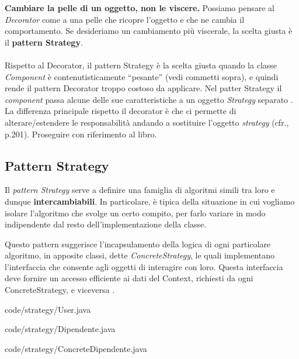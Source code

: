 \documentclass[12pt]{article}
\begin{document}
\textbf{Cambiare la pelle di un oggetto, non le viscere.} Possiamo pensare al {\em Decorator} come a una pelle che ricopre l'oggetto e che ne cambia il comportamento. Se desideriamo un cambiamento più viscerale, la scelta giusta è il \textbf{pattern Strategy}.
\\
\\
Rispetto al Decorator, il pattern Strategy è la scelta giusta quando la classe {\em Component} è contenutisticamente ``pesante'' (vedi commetti sopra), e quindi rende il pattern Decorator troppo costoso da applicare.
Nel patter Strategy il {\em component} passa alcune delle sue caratteristiche a un oggetto {\em Strategy} separato \cite{gof_sunt}.
La differenza principale rispetto il decorator è che ci permette di alterare/estendere le responsabilità andando a sostituire l'oggetto {\em strategy} (cfr.\cite{gof_riferimento}, p.201).
Proseguire con riferimento al libro.


\subsection{Pattern Strategy}

Il {\em pattern Strategy} serve a definire una famiglia di algoritmi simili tra loro e dunque \textbf{intercambiabili}. In particolare, è tipica della situazione in cui vogliamo isolare l’algoritmo che svolge un certo compito, per farlo variare in modo indipendente dal resto dell’implementazione della classe.

Questo pattern suggerisce l’incapsulamento della logica di ogni
particolare algoritmo, in apposite classi, dette {\em ConcreteStrategy}, le quali implementano l’interfaccia che consente agli oggetti di interagire con loro. Questa interfaccia deve fornire un accesso efficiente ai dati del Context, richiesti da ogni ConcreteStrategy, e viceversa \cite{gof_sunt}.


{code/strategy/User.java}


{code/strategy/Dipendente.java}


{code/strategy/ConcreteDipendente.java}
\end{document}

